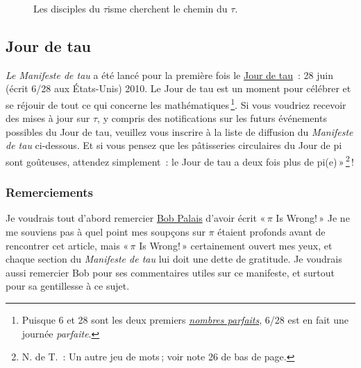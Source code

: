 \begin{figure}
\begin{center}
\end{center}
\caption{Les disciples du $\tau$isme cherchent le chemin du $\tau$.\label{fig:tauism}}
\end{figure}



  \subsection{Jour de tau} %
  \label{sec:tau_day}

\emph{Le Manifeste de tau} a été lancé pour la première fois le \href{https://tauday.com/}{Jour de tau}~: 28 juin (écrit 6/28 aux États-Unis) 2010. Le Jour de tau est un moment pour célébrer et se réjouir de tout ce qui concerne les mathématiques\,\footnote{Puisque 6 et 28 sont les deux premiers \href{https://fr.wikipedia.org/wiki/Nombre_parfait}{\emph{nombres parfaits}}, 6/28 est en fait une journée \emph{parfaite}.}. Si vous voudriez recevoir des mises à jour sur $\tau$, y compris des notifications sur les futurs événements possibles du Jour de tau, veuillez vous inscrire à la liste de diffusion du \emph{Manifeste de tau} ci-dessous. Et si vous pensez que les pâtisseries circulaires du Jour de pi sont goûteuses, attendez simplement~: le Jour de tau a deux fois plus de \og pi(e)\,»\,\footnote{N. de T.~: Un autre jeu de mots\,; voir note 26 de bas de page.}\,!


  \subsubsection{Remerciements} %
  \label{sec:acknowledgments}

Je voudrais tout d'abord remercier \href{https://www.math.utah.edu/~palais}{Bob Palais} d'avoir écrit «\,$\pi$ Is Wrong!\,» Je ne me souviens pas à quel point mes soupçons sur $\pi$ étaient profonds avant de rencontrer cet article, mais «\,$\pi$ Is Wrong!\,» certainement ouvert mes yeux, et chaque section du \emph{Manifeste de tau} lui doit une dette de gratitude. Je voudrais aussi remercier Bob pour ses commentaires utiles sur ce manifeste, et surtout pour sa gentillesse à ce sujet.

